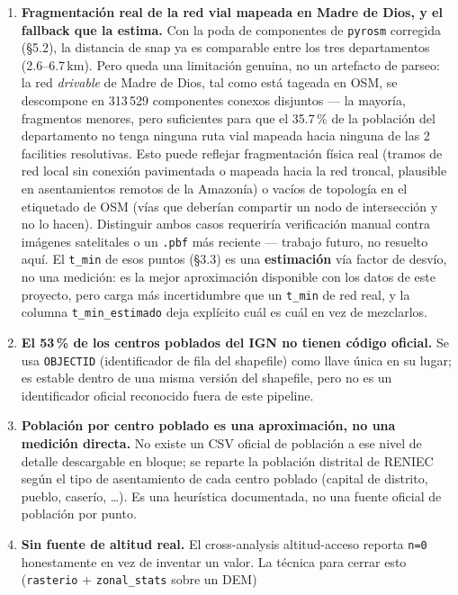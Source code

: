\documentclass[11pt]{article}
\begin{document}
\begin{enumerate}
\item \textbf{Fragmentación real de la red vial mapeada en Madre de
  Dios, y el fallback que la estima.} Con la poda de componentes de
  \texttt{pyrosm} corregida (\S5.2), la distancia de snap ya es comparable
  entre los tres departamentos (2.6--6.7\,km). Pero queda una limitación
  genuina, no un artefacto de parseo: la red \emph{drivable} de Madre de
  Dios, tal como está tageada en OSM, se descompone en 313\,529 componentes
  conexos disjuntos --- la mayoría, fragmentos menores, pero suficientes
  para que el 35.7\,\% de la población del departamento no tenga ninguna
  ruta vial mapeada hacia ninguna de las 2 facilities resolutivas. Esto
  puede reflejar fragmentación física real (tramos de red local sin
  conexión pavimentada o mapeada hacia la red troncal, plausible en
  asentamientos remotos de la Amazonía) o vacíos de topología en el
  etiquetado de OSM (vías que deberían compartir un nodo de intersección y
  no lo hacen). Distinguir ambos casos requeriría verificación manual
  contra imágenes satelitales o un \texttt{.pbf} más reciente --- trabajo
  futuro, no resuelto aquí. El \texttt{t\_min} de esos puntos (\S3.3) es
  una \textbf{estimación} vía factor de desvío, no una medición: es la
  mejor aproximación disponible con los datos de este proyecto, pero carga
  más incertidumbre que un \texttt{t\_min} de red real, y la columna
  \texttt{t\_min\_estimado} deja explícito cuál es cuál en vez de
  mezclarlos.
\item \textbf{El 53\,\% de los centros poblados del IGN no tienen código
  oficial.} Se usa \texttt{OBJECTID} (identificador de fila del shapefile)
  como llave única en su lugar; es estable dentro de una misma versión del
  shapefile, pero no es un identificador oficial reconocido fuera de este
  pipeline.
\item \textbf{Población por centro poblado es una aproximación, no una
  medición directa.} No existe un CSV oficial de población a ese nivel de
  detalle descargable en bloque; se reparte la población distrital de
  RENIEC según el tipo de asentamiento de cada centro poblado (capital de
  distrito, pueblo, caserío, \ldots). Es una heurística documentada, no una
  fuente oficial de población por punto.
\item \textbf{Sin fuente de altitud real.} El cross-analysis altitud-acceso
  reporta \texttt{n=0} honestamente en vez de inventar un valor. La técnica
  para cerrar esto (\texttt{rasterio} + \texttt{zonal\_stats} sobre un DEM)

\end{enumerate}
\end{document}

